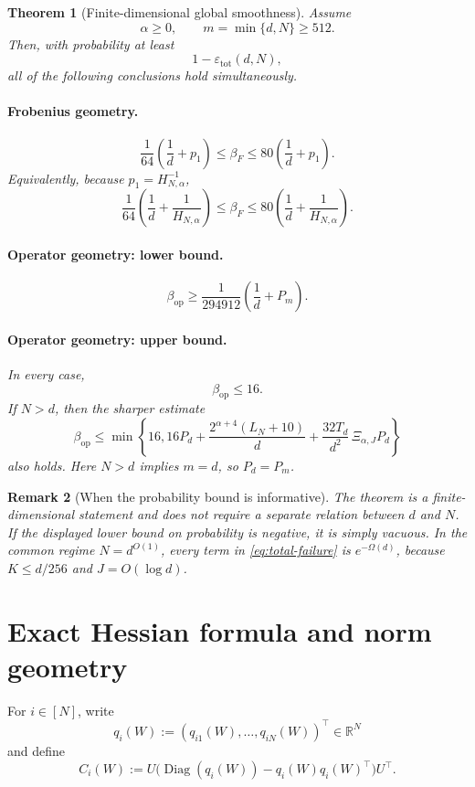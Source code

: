 \documentclass[11pt]{article}
\newtheorem{theorem}{Theorem}[section]
\newtheorem{remark}[theorem]{Remark}
\newcommand{\R}{\mathbb{R}}
\newcommand{\1}{\mathbf{1}}
\newcommand{\op}{\mathrm{op}}
\newcommand{\Diag}{\operatorname{Diag}}
\begin{document}
\begin{theorem}[Finite-dimensional global smoothness]
\label{thm:main}
Assume
\[
 \alpha\ge 0,
 \qquad
 m=\min\{d,N\}\ge 512.
\]
Then, with probability at least
\[
 \boxed{1-\varepsilon_{\mathrm{tot}}(d,N)},
\]
all of the following conclusions hold simultaneously.

\paragraph{Frobenius geometry.}
\[
 \boxed{
 \frac1{64}\left(\frac1d+p_1\right)
 \le \beta_F
 \le 80\left(\frac1d+p_1\right).
 }
\]
Equivalently, because \(p_1=H_{N,\alpha}^{-1}\),
\[
 \frac1{64}\left(\frac1d+\frac1{H_{N,\alpha}}\right)
 \le \beta_F
 \le 80\left(\frac1d+\frac1{H_{N,\alpha}}\right).
\]

\paragraph{Operator geometry: lower bound.}
\[
 \boxed{
 \beta_{\op}
 \ge
 \frac1{294912}
 \left(\frac1d+P_m\right).
 }
\]

\paragraph{Operator geometry: upper bound.}
In every case,
\[
 \boxed{\beta_{\op}\le 16.}
\]
If \(N>d\), then the sharper estimate
\[
 \boxed{
 \beta_{\op}
 \le
 \min\left\{
 16,
 16P_d
 +\frac{2^{\alpha+4}(L_N+10)}{d}
 +\frac{32T_d}{d^2}\,\Xi_{\alpha,J}P_d
 \right\}
 }
\]
also holds.  Here \(N>d\) implies \(m=d\), so \(P_d=P_m\).
\end{theorem}

\begin{remark}[When the probability bound is informative]
The theorem is a finite-dimensional statement and does not require a separate
relation between \(d\) and \(N\).  If the displayed lower bound on probability
is negative, it is simply vacuous.  In the common regime \(N=d^{O(1)}\), every
term in \eqref{eq:total-failure} is \(e^{-\Omega(d)}\), because
\(K\le d/256\) and \(J=O(\log d)\).
\end{remark}

\section{Exact Hessian formula and norm geometry}
\label{sec:hessian}

For \(i\in[N]\), write
\[
 q_i(W):=(q_{i1}(W),\ldots,q_{iN}(W))^\top\in\R^N
\]
and define
\[
 C_i(W)
 :=
 U\bigl(\Diag(q_i(W))-q_i(W)q_i(W)^\top\bigr)U^\top.
\]
\end{document}

